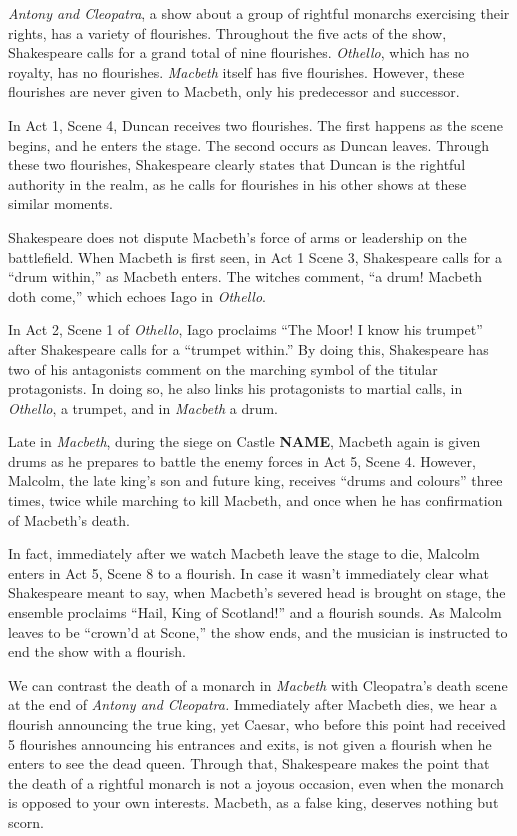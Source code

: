 \documentclass[12pt]{article}[titlepage]
\newcommand{\say}[1]{``#1''}
\newcommand{\1}{\={a}}
\newcommand{\2}{\={e}}
\newcommand{\3}{\={\i}}
\newcommand{\4}{\=o}
\newcommand{\5}{\=u}
\newcommand{\6}{\={A}}
\renewcommand{\,}{\textsuperscript{,}}
\begin{document}
\textit{Antony and Cleopatra}, a show about a group of rightful monarchs exercising their rights, has a variety of flourishes.
Throughout the five acts of the show, Shakespeare calls for a grand total of nine flourishes.
\textit{Othello}, which has no royalty, has no flourishes.
\textit{Macbeth} itself has five flourishes.
However, these flourishes are never given to Macbeth, only his predecessor and successor.

In Act 1, Scene 4, Duncan receives two flourishes.
The first happens as the scene begins, and he enters the stage.
The second occurs as Duncan leaves.
Through these two flourishes, Shakespeare clearly states that Duncan is the rightful authority in the realm, as he calls for flourishes in his other shows at these similar moments.

Shakespeare does not dispute Macbeth's force of arms or leadership on the battlefield.
When Macbeth is first seen, in Act 1 Scene 3, Shakespeare calls for a \say{drum within,} as Macbeth enters.
The witches comment, \say{a drum! Macbeth doth come,} which echoes Iago in \textit{Othello}.

In Act 2, Scene 1 of \textit{Othello}, Iago proclaims \say{The Moor! I know his trumpet} after Shakespeare calls for a \say{trumpet within.}
By doing this, Shakespeare has two of his antagonists comment on the marching symbol of the titular protagonists.
In doing so, he also links his protagonists to martial calls, in \textit{Othello}, a trumpet, and in \textit{Macbeth} a drum.

Late in \textit{Macbeth}, during the siege on Castle \textbf{NAME}, Macbeth again is given drums as he prepares to battle the enemy forces in Act 5, Scene 4.
However, Malcolm, the late king's son and future king, receives \say{drums and colours} three times, twice while marching to kill Macbeth, and once when he has confirmation of Macbeth's death.

In fact, immediately after we watch Macbeth leave the stage to die, Malcolm enters in Act 5, Scene 8 to a flourish.
In case it wasn't immediately clear what Shakespeare meant to say, when Macbeth's severed head is brought on stage, the ensemble proclaims \say{Hail, King of Scotland!} and a flourish sounds.
As Malcolm leaves to be \say{crown'd at Scone,} the show ends, and the musician is instructed to end the show with a flourish.

We can contrast the death of a monarch in \textit{Macbeth} with Cleopatra's death scene at the end of \textit{Antony and Cleopatra.}
Immediately after Macbeth dies, we hear a flourish announcing the true king, yet Caesar, who before this point had received 5 flourishes announcing his entrances and exits, is not given a flourish when he enters to see the dead queen.
Through that, Shakespeare makes the point that the death of a rightful monarch is not a joyous occasion, even when the monarch is opposed to your own interests.
Macbeth, as a false king, deserves nothing but scorn.
\end{document}

